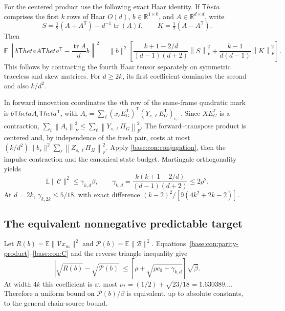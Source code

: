 \documentclass[11pt,oneside,openany,a4paper]{book}
\numberwithin{equation}{chapter}
\theoremstyle{definition}
\theoremstyle{remark}
\newcommand{\R}{\mathbb R}\newcommand{\E}{\mathbb E}\newcommand{\Prb}{\mathbb P}\newcommand{\PP}{\mathbb P}
\newcommand{\T}{\mathsf T}\newcommand{\Id}{I}
\newcommand{\F}[1]{\left\lVert#1\right\rVert_F}
\DeclareMathOperator{\tr}{tr}\DeclareMathOperator{\rank}{rank}
\begin{document}
For the centered product use the following exact Haar identity. If $\T heta$ comprises the first $k$ rows of Haar $O(d)$, $b\in\R^{1\times k}$, and $A\in\R^{d\times d}$, write
\[
 S=\tfrac12(A+A^\T)-d^{-1}\tr(A)I,\qquad K=\tfrac12(A-A^\T).
\]
Then
\begin{equation}\label{base:con:conjugation}
 \E\left\|b\T heta A\T heta^\T-\frac{\tr A}{d}b\right\|^2
 =\|b\|^2\left[
 \frac{k+1-2/d}{(d-1)(d+2)}\F S^2+
 \frac{k-1}{d(d-1)}\F K^2\right].
\end{equation}
This follows by contracting the fourth Haar tensor separately on symmetric traceless and skew matrices. For $d\ge2k$, its first coefficient dominates the second and also $k/d^2$.

In forward innovation coordinates the $i$th row of the same-frame quadratic mark is $b\T heta A_i\T heta^\T$, with
$A_i=\sum_\ell (x_\ell E_G^\T)^\T(Y_{s,\ell}E_G^\T)_{i,:}$. Since $XE_G^\T$ is a contraction,
$\sum_i\F{A_i}^2\le\sum_\ell\F{Y_{s,\ell}\Pi_G}^2$.
The forward--transpose product is centered and, by independence of the fresh pair, costs at most
$(k/d^2)\|b_s\|^2\sum_\ell\F{Z_{s,\ell}\Pi_H}^2$.
Apply \eqref{base:con:conjugation}, then the impulse contraction and the canonical state budget. Martingale orthogonality yields
\begin{equation}\label{base:con:C}
 \E\|\mathcal C\|^2\le\gamma_{k,d}\beta,
 \qquad\gamma_{k,d}=\frac{k(k+1-2/d)}{(d-1)(d+2)}\le2\rho^2.
\end{equation}
At $d=2k$, $\gamma_{k,2k}\le5/18$, with exact difference
$(k-2)^2/[9(4k^2+2k-2)]$.

\subsection{The equivalent nonnegative predictable target}
Let $R(b)=\E\|\mathcal Vx_m\|^2$ and
$\mathcal P(b)=\E\|\mathcal B\|^2$. Equations~\eqref{base:con:parity-product}--\eqref{base:con:C} and the reverse triangle inequality give
\begin{equation}\label{base:con:equivalence}
 |\sqrt{R(b)}-\sqrt{\mathcal P(b)}|
 \le[\rho+\sqrt{\rho c_0+\gamma_{k,d}}]\sqrt\beta.
\end{equation}
At width $4k$ this coefficient is at most
$\nu_*=(1/2)+\sqrt{23/18}=1.630389\ldots$. Therefore a uniform bound on $\mathcal P(b)/\beta$ is equivalent, up to absolute constants, to the general chain-source bound.
\end{document}
